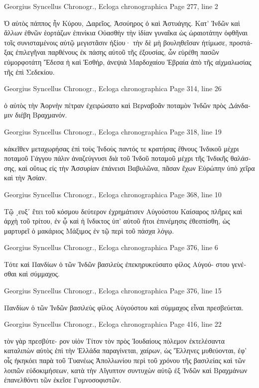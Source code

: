 \documentclass[12pt,letterpaper,twoside,final]{memoir}
\begin{document}
\begin{greek}
Georgius Syncellus Chronogr., Ecloga chronographica 
Page 277, line 2

Ὁ αὐτὸς πάππος ἦν Κύρου, Δαρεῖος, Ἀσούηρος ὁ καὶ Ἀστυάγης. 
 Κατ' Ἰνδῶν καὶ ἄλλων ἐθνῶν ἑορτάζων ἐπινίκια Οὐασθὴν τὴν ἰδίαν 
γυναῖκα ὡς ὡραιοτάτην ὀφθῆναι τοῖς συνισταμένοις αὐτῷ μεγιστᾶσιν 
ἠξίου· τὴν δὲ μὴ βουληθεῖσαν ἠτίμωσε, προστάξας ἐπιλεγῆναι παρθένους 
ἐκ πάσης αὐτοῦ τῆς ἐξουσίας, ὧν εὑρέθη πασῶν εὐμορφοτάτη Ἔδεσα ἡ 
καὶ Ἐσθήρ, ἀνεψιὰ Μαρδοχαίου Ἑβραία ἀπὸ τῆς αἰχμαλωσίας τῆς ἐπὶ 
Σεδεκίου. 



Georgius Syncellus Chronogr., Ecloga chronographica 
Page 314, line 26

ὁ αὐτὸς τὴν Ἀορνὴν πέτραν ἐχειρώσατο καὶ Βερναβοᾶν ποταμὸν Ἰνδῶν 
πρὸς Δάνδαμιν διέβη Βραχμανόν. 



Georgius Syncellus Chronogr., Ecloga chronographica 
Page 318, line 19

κἀκεῖθεν μεταχωρήσας ἐπὶ τοὺς Ἰνδοὺς παντός τε κρατήσας ἔθνους 
Ἰνδικοῦ μέχρι ποταμοῦ Γάγγου πάλιν ἀναζεύγνυσι διὰ τοῦ Ἰνδοῦ ποταμοῦ 
μέχρι τῆς Ἰνδικῆς θαλάσσης, καὶ οὕτως εἰς τὴν Ἀσσυρίαν ἐπάνεισι 
Βαβυλῶνα, πᾶσαν ἔχων Εὐρώπην ὑπὸ χεῖρα καὶ τὴν Ἀσίαν. 



Georgius Syncellus Chronogr., Ecloga chronographica 
Page 368, line 10

Τῷ ͵ευξʹ ἔτει τοῦ κόσμου δεύτερον ἐχρημάτισεν Αὐγούστου Καίσαρος 
πλῆρες καὶ ἀρχὴ τοῦ τρίτου, ἐν ᾧ καὶ ἡ ἴνδικτος ὑπ' αὐτοῦ ἤτοι ἐπινέμησις 
ἐθεσπίσθη, ὡς μαρτυρεῖ ὁ μακάριος Μάξιμος ἐν τῷ περὶ τοῦ πάσχα λόγῳ. 



Georgius Syncellus Chronogr., Ecloga chronographica 
Page 376, line 6

Τότε καὶ Πανδίων ὁ τῶν Ἰνδῶν βασιλεὺς ἐπεκηρυκεύσατο φίλος Αὐγού-
στου γενέσθαι καὶ σύμμαχος. 



Georgius Syncellus Chronogr., Ecloga chronographica 
Page 376, line 15

Πανδίων ὁ τῶν Ἰνδῶν βασιλεὺς φίλος Αὐγούστου καὶ σύμμαχος εἶναι 
πρεσβεύεται. 



Georgius Syncellus Chronogr., Ecloga chronographica 
Page 416, line 22

                                                            τὸν γὰρ πρεσβύτε-
ρον υἱὸν Τίτον τὸν πρὸς Ἰουδαίους πόλεμον ἐκτελέσαντα καταλιπὼν αὐτὸς 
ἐπὶ τὴν Ἑλλάδα παραγίνεται, χαίρων, ὡς Ἕλληνες μυθεύονται, ἐφ' οἷς 
ἠκηκόει παρὰ τοῦ Τυανέως Ἀπολλωνίου περὶ τοῦ χρόνου τῆς βασιλείας 
καὶ τῶν λοιπῶν εὐδοκιμήσεων, κατὰ τὴν Αἴγυπτον συντυχὼν αὐτῷ ἐξ 
Ἰνδῶν καὶ Βραχμάνων ἐπανελθόντι τῶν ἐκεῖσε Γυμνοσοφιστῶν. 



\end{greek}
\end{document}
